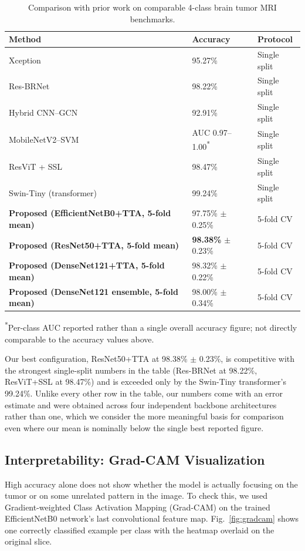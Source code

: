 \documentclass[11pt]{article}
\begin{document}
\begin{table}[htbp]
\centering
\caption{Comparison with prior work on comparable 4-class brain tumor MRI benchmarks.}
\label{tab:sota_comparison}
\small
\begin{tabular}{@{}p{5.0cm}p{2.3cm}p{2.8cm}@{}}
\toprule
\textbf{Method} & \textbf{Accuracy} & \textbf{Protocol} \\
\midrule
Xception \cite{disci2025advanced} & 95.27\% & Single split \\
Res-BRNet \cite{zahoor2024resbrnet} & 98.22\% & Single split \\
Hybrid CNN--GCN \cite{alkasasbeh2026cnngcn} & 92.91\% & Single split \\
MobileNetV2--SVM \cite{adamu2024mobilenetsvm} & AUC 0.97--1.00\textsuperscript{*} & Single split \\
ResViT + SSL \cite{karagoz2024resvit} & 98.47\% & Single split \\
Swin-Tiny (transformer) \cite{gomezguzman2025swin} & 99.24\% & Single split \\
\textbf{Proposed (EfficientNetB0+TTA, 5-fold mean)} & 97.75\% $\pm$ 0.25\% & 5-fold CV \\
\textbf{Proposed (ResNet50+TTA, 5-fold mean)} & \textbf{98.38\%} $\pm$ 0.23\% & 5-fold CV \\
\textbf{Proposed (DenseNet121+TTA, 5-fold mean)} & 98.32\% $\pm$ 0.22\% & 5-fold CV \\
\textbf{Proposed (DenseNet121 ensemble, 5-fold mean)} & 98.00\% $\pm$ 0.34\% & 5-fold CV \\
\bottomrule
\end{tabular}

\vspace{1mm}
{\footnotesize \textsuperscript{*}Per-class AUC reported rather than a single overall accuracy figure; not directly comparable to the accuracy values above.}
\end{table}

Our best configuration, ResNet50+TTA at 98.38\% $\pm$ 0.23\%, is competitive with the strongest single-split numbers in the table (Res-BRNet at 98.22\%, ResViT+SSL at 98.47\%) and is exceeded only by the Swin-Tiny transformer's 99.24\%. Unlike every other row in the table, our numbers come with an error estimate and were obtained across four independent backbone architectures rather than one, which we consider the more meaningful basis for comparison even where our mean is nominally below the single best reported figure.

\subsection{Interpretability: Grad-CAM Visualization}
\label{sec:gradcam}
High accuracy alone does not show whether the model is actually focusing on the tumor or on some unrelated pattern in the image. To check this, we used Gradient-weighted Class Activation Mapping (Grad-CAM) \cite{selvaraju2017gradcam} on the trained EfficientNetB0 network's last convolutional feature map. Fig.~\ref{fig:gradcam} shows one correctly classified example per class with the heatmap overlaid on the original slice.
\end{document}
